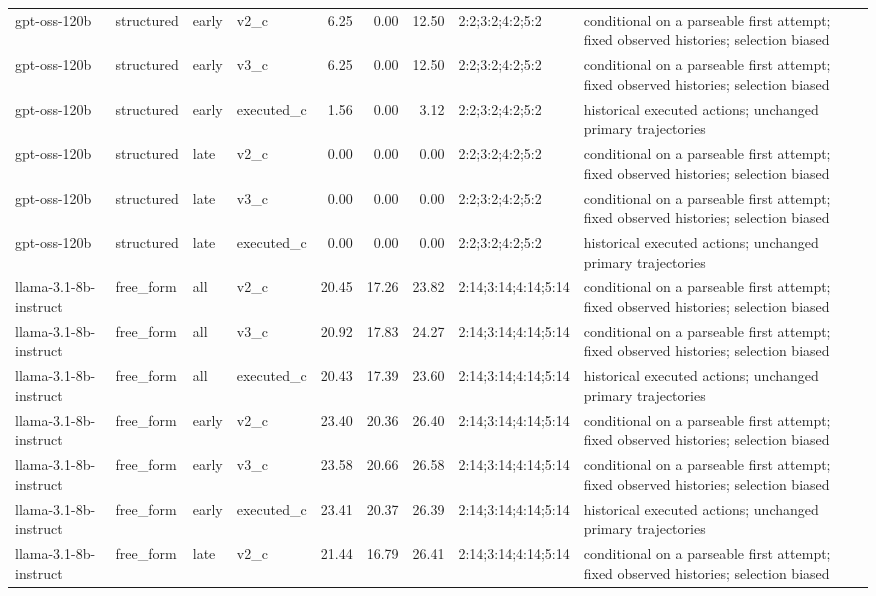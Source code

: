 \begin{tabular}{llllrrrll}
gpt-oss-120b & structured & early & v2\_c & 6.25 & 0.00 & 12.50 & 2:2;3:2;4:2;5:2 & conditional on a parseable first attempt; fixed observed histories; selection biased \\
gpt-oss-120b & structured & early & v3\_c & 6.25 & 0.00 & 12.50 & 2:2;3:2;4:2;5:2 & conditional on a parseable first attempt; fixed observed histories; selection biased \\
gpt-oss-120b & structured & early & executed\_c & 1.56 & 0.00 & 3.12 & 2:2;3:2;4:2;5:2 & historical executed actions; unchanged primary trajectories \\
gpt-oss-120b & structured & late & v2\_c & 0.00 & 0.00 & 0.00 & 2:2;3:2;4:2;5:2 & conditional on a parseable first attempt; fixed observed histories; selection biased \\
gpt-oss-120b & structured & late & v3\_c & 0.00 & 0.00 & 0.00 & 2:2;3:2;4:2;5:2 & conditional on a parseable first attempt; fixed observed histories; selection biased \\
gpt-oss-120b & structured & late & executed\_c & 0.00 & 0.00 & 0.00 & 2:2;3:2;4:2;5:2 & historical executed actions; unchanged primary trajectories \\
llama-3.1-8b-instruct & free\_form & all & v2\_c & 20.45 & 17.26 & 23.82 & 2:14;3:14;4:14;5:14 & conditional on a parseable first attempt; fixed observed histories; selection biased \\
llama-3.1-8b-instruct & free\_form & all & v3\_c & 20.92 & 17.83 & 24.27 & 2:14;3:14;4:14;5:14 & conditional on a parseable first attempt; fixed observed histories; selection biased \\
llama-3.1-8b-instruct & free\_form & all & executed\_c & 20.43 & 17.39 & 23.60 & 2:14;3:14;4:14;5:14 & historical executed actions; unchanged primary trajectories \\
llama-3.1-8b-instruct & free\_form & early & v2\_c & 23.40 & 20.36 & 26.40 & 2:14;3:14;4:14;5:14 & conditional on a parseable first attempt; fixed observed histories; selection biased \\
llama-3.1-8b-instruct & free\_form & early & v3\_c & 23.58 & 20.66 & 26.58 & 2:14;3:14;4:14;5:14 & conditional on a parseable first attempt; fixed observed histories; selection biased \\
llama-3.1-8b-instruct & free\_form & early & executed\_c & 23.41 & 20.37 & 26.39 & 2:14;3:14;4:14;5:14 & historical executed actions; unchanged primary trajectories \\
llama-3.1-8b-instruct & free\_form & late & v2\_c & 21.44 & 16.79 & 26.41 & 2:14;3:14;4:14;5:14 & conditional on a parseable first attempt; fixed observed histories; selection biased \\

\end{tabular}
